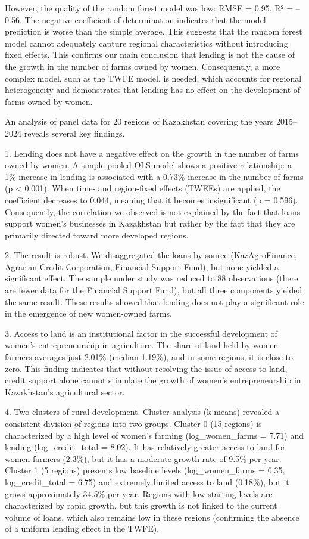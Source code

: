 \documentclass[
]{article}
\begin{document}
However, the quality of the random forest model was low: RMSE = 0.95, R²
= --0.56. The negative coefficient of determination indicates that the
model prediction is worse than the simple average. This suggests that
the random forest model cannot adequately capture regional
characteristics without introducing fixed effects. This confirms our
main conclusion that lending is not the cause of the growth in the
number of farms owned by women. Consequently, a more complex model, such
as the TWFE model, is needed, which accounts for regional heterogeneity
and demonstrates that lending has no effect on the development of farms
owned by women.

An analysis of panel data for 20 regions of Kazakhstan covering the
years 2015--2024 reveals several key findings.

1. Lending does not have a negative effect on the growth in the number
of farms owned by women. A simple pooled OLS model shows a positive
relationship: a 1\% increase in lending is associated with a 0.73\%
increase in the number of farms (p \textless{} 0.001). When time- and
region-fixed effects (TWEEs) are applied, the coefficient decreases to
0.044, meaning that it becomes insignificant (p = 0.596). Consequently,
the correlation we observed is not explained by the fact that loans
support women's businesses in Kazakhstan but rather by the fact that
they are primarily directed toward more developed regions.

2. The result is robust. We disaggregated the loans by source
(KazAgroFinance, Agrarian Credit Corporation, Financial Support Fund),
but none yielded a significant effect. The sample under study was
reduced to 88 observations (there are fewer data for the Financial
Support Fund), but all three components yielded the same result. These
results showed that lending does not play a significant role in the
emergence of new women-owned farms.

3. Access to land is an institutional factor in the successful
development of women's entrepreneurship in agriculture. The share of
land held by women farmers averages just 2.01\% (median 1.19\%), and in
some regions, it is close to zero. This finding indicates that without
resolving the issue of access to land, credit support alone cannot
stimulate the growth of women's entrepreneurship in Kazakhstan's
agricultural sector.

4. Two clusters of rural development. Cluster analysis (k-means)
revealed a consistent division of regions into two groups. Cluster 0 (15
regions) is characterized by a high level of women's farming
(log\_women\_farms = 7.71) and lending (log\_credit\_total = 8.02). It
has relatively greater access to land for women farmers (2.3\%), but it
has a moderate growth rate of 9.5\% per year. Cluster 1 (5 regions)
presents low baseline levels (log\_women\_farms = 6.35,
log\_credit\_total = 6.75) and extremely limited access to land
(0.18\%), but it grows approximately 34.5\% per year. Regions with low
starting levels are characterized by rapid growth, but this growth is
not linked to the current volume of loans, which also remains low in
these regions (confirming the absence of a uniform lending effect in the
TWFE).
\end{document}
